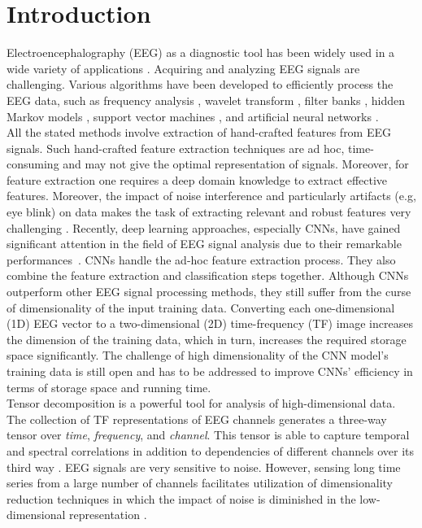 \documentclass{article}
\begin{document}
\section{Introduction}
\vspace{-5pt}
 Electroencephalography (EEG) as a diagnostic tool has been widely used in a wide variety of applications \cite{Game,Feature}. Acquiring and analyzing EEG signals are challenging. Various algorithms have been developed to efficiently process the EEG data, such as frequency analysis \cite{spectro_intro}, wavelet transform \cite{Wavelet_Intro}, filter banks \cite{emd_Intro}, hidden Markov models \cite{HMM_Intro}, support vector machines \cite{SVM_Intro}, and
artificial neural networks \cite{NN_Intro}. \\
\indent All the stated methods involve extraction of hand-crafted features from EEG signals.  Such hand-crafted feature extraction techniques are ad hoc, time-consuming and may not give the optimal representation of signals. Moreover, for feature extraction one requires a deep domain knowledge to extract effective features. Moreover, the impact of noise interference and particularly artifacts (e.g, eye blink) on data makes the
task of extracting relevant and robust features very challenging \cite{eye_blink}. Recently, deep learning approaches, especially CNNs, have gained significant attention in the field of EEG signal analysis due to their remarkable performances~\cite{CNN_Intro,CNN1_Intro}. CNNs handle the ad-hoc feature extraction process. They also combine the feature extraction and classification steps together. Although CNNs outperform other EEG signal processing methods, they still suffer from the curse of dimensionality of the input training data. Converting each one-dimensional (1D) EEG vector to a two-dimensional (2D) time-frequency (TF) image increases the dimension of the training data, which in turn, increases the required storage space significantly. The challenge of high dimensionality of the CNN model's training data is still open and has to be addressed to improve CNNs' efficiency in terms of storage space and running time.\\
\indent Tensor decomposition is a powerful tool for analysis of high-dimensional data. The collection of TF representations of EEG channels generates a three-way tensor over \emph{time}, \emph{frequency}, and \emph{channel}. This tensor is able to capture temporal and spectral correlations in addition to dependencies of different channels over its third way \cite{tensor}. EEG signals are very sensitive to noise. However, sensing long time series from a large number of channels facilitates utilization of dimensionality reduction techniques in which the impact of noise is diminished in the low-dimensional representation \cite{tensor_noise}.\\
\end{document}
